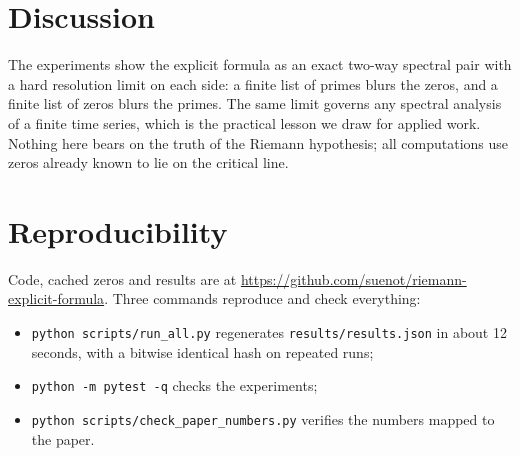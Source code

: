 \documentclass[11pt]{article}
\begin{document}
\section{Discussion}

The experiments show the explicit formula as an exact two-way spectral pair with a hard resolution limit on each side: a finite list of primes blurs the zeros, and a finite list of zeros blurs the primes. The same limit governs any spectral analysis of a finite time series, which is the practical lesson we draw for applied work. Nothing here bears on the truth of the Riemann hypothesis; all computations use zeros already known to lie on the critical line.

\section*{Reproducibility}

Code, cached zeros and results are at \url{https://github.com/suenot/riemann-explicit-formula}. Three commands reproduce and check everything:
\begin{itemize}
\item \texttt{python scripts/run\_all.py} regenerates \texttt{results/results.json} in about 12 seconds, with a bitwise identical hash on repeated runs;
\item \texttt{python -m pytest -q} checks the experiments;
\item \texttt{python scripts/check\_paper\_numbers.py} verifies the numbers mapped to the paper.
\end{itemize}



\end{document}
